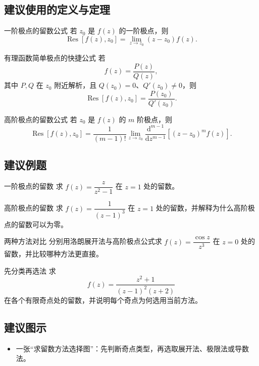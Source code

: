 \subsection*{建议使用的定义与定理}
\begin{dingli}{一阶极点的留数公式}{}
若 $z_0$ 是 $f(z)$ 的一阶极点，则
\[
    \operatorname{Res}[f(z),z_0]
    =
    \lim_{z\to z_0}(z-z_0)f(z).
\]
\end{dingli}

\begin{dingli}{有理函数简单极点的快捷公式}{}
若
\[
    f(z)=\frac{P(z)}{Q(z)},
\]
其中 $P,Q$ 在 $z_0$ 附近解析，且 $Q(z_0)=0$、$Q'(z_0)\neq 0$，则
\[
    \operatorname{Res}[f(z),z_0]=\frac{P(z_0)}{Q'(z_0)}.
\]
\end{dingli}

\begin{dingli}{高阶极点的留数公式}{}
若 $z_0$ 是 $f(z)$ 的 $m$ 阶极点，则
\[
    \operatorname{Res}[f(z),z_0]
    =
    \frac{1}{(m-1)!}
    \lim_{z\to z_0}
    \frac{\mathrm{d}^{m-1}}{\mathrm{d}z^{m-1}}
    \left[(z-z_0)^m f(z)\right].
\]
\end{dingli}

\subsection*{建议例题}
\begin{lizi}{一阶极点的留数}{}
求 $f(z)=\dfrac{z}{z^2-1}$ 在 $z=1$ 处的留数。
\end{lizi}

\begin{lizi}{高阶极点的留数}{}
求 $f(z)=\dfrac{1}{(z-1)^3}$ 在 $z=1$ 处的留数，并解释为什么高阶极点的留数可以为零。
\end{lizi}

\begin{lizi}{两种方法对比}{}
分别用洛朗展开法与高阶极点公式求 $f(z)=\dfrac{\cos z}{z^3}$ 在 $z=0$ 处的留数，并比较哪种方法更直接。
\end{lizi}

\begin{lizi}{先分类再选法}{}
求
\[
    f(z)=\frac{z^2+1}{(z-1)^2(z+2)}
\]
在各个有限奇点处的留数，并说明每个奇点为何选用当前方法。
\end{lizi}

\subsection*{建议图示}
\begin{itemize}
    \item 一张``求留数方法选择图''：先判断奇点类型，再选取展开法、极限法或导数法。
\end{itemize}

